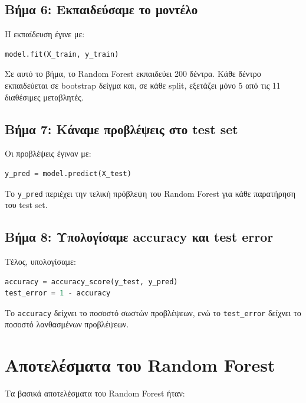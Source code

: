 \documentclass[12pt,a4paper]{article}
\newcommand{\code}[1]{\texttt{\textenglish{#1}}}
\begin{document}
\subsection{Βήμα 6: Εκπαιδεύσαμε το μοντέλο}

Η εκπαίδευση έγινε με:

\begin{lstlisting}[language=Python]
model.fit(X_train, y_train)
\end{lstlisting}

Σε αυτό το βήμα, το Random Forest εκπαιδεύει 200 δέντρα. Κάθε δέντρο
εκπαιδεύεται σε bootstrap δείγμα και, σε κάθε split, εξετάζει μόνο 5 από τις
11 διαθέσιμες μεταβλητές.

\subsection{Βήμα 7: Κάναμε προβλέψεις στο test set}

Οι προβλέψεις έγιναν με:

\begin{lstlisting}[language=Python]
y_pred = model.predict(X_test)
\end{lstlisting}

Το \code{y\_pred} περιέχει την τελική πρόβλεψη του Random Forest για κάθε
παρατήρηση του test set.

\subsection{Βήμα 8: Υπολογίσαμε accuracy και test error}

Τέλος, υπολογίσαμε:

\begin{lstlisting}[language=Python]
accuracy = accuracy_score(y_test, y_pred)
test_error = 1 - accuracy
\end{lstlisting}

Το \code{accuracy} δείχνει το ποσοστό σωστών προβλέψεων, ενώ το
\code{test\_error} δείχνει το ποσοστό λανθασμένων προβλέψεων.

\section{Αποτελέσματα του Random Forest}

Τα βασικά αποτελέσματα του Random Forest ήταν:
\end{document}
